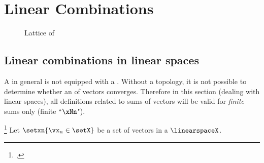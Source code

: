 
\chapter{Linear Combinations}
\begin{figure}
  \centering%
  \gsize%
  \caption{Lattice of }
\end{figure}
\section{Linear combinations in linear spaces}
A   in general is not equipped with a
.
Without a topology, it is not possible to determine whether an 
of vectors converges.
Therefore in this section (dealing with linear spaces),
all definitions related to sums of vectors will be valid for \emph{finite} sums only (finite ``$\xNn$").

\begin{definition}
\footnote{
  ,
  }
\label{def:lincombo}
Let $\setxn{\vx_n\in\setX}$ be a set of vectors in a  $\linearspaceX$.
\end{definition}

